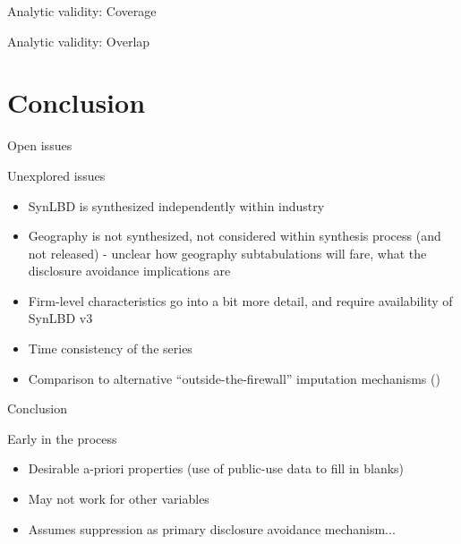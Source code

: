 \begin{frame}[fragile]{Analytic validity: Coverage}
	\begin{center}
		\footnotesize
		
		
		
	\end{center}
\end{frame}

\begin{frame}[fragile]{Analytic validity: Overlap}
	\begin{center}
		\footnotesize
		
		
		
	\end{center}
\end{frame}









\section{Conclusion}

\begin{frame}{Open issues}
\begin{block}{Unexplored issues}
\begin{itemize}[<+->]
\item SynLBD is synthesized independently within industry
\item Geography is not synthesized, not considered within synthesis process (and not released) 
- unclear how geography subtabulations will fare, what the disclosure avoidance implications are
\item Firm-level characteristics go into a bit more detail, and require availability of SynLBD v3
\item Time consistency of the series
\item Comparison to alternative ``outside-the-firewall'' imputation mechanisms 
(\cite{HolanEtAl2010,BradleyEtAl2014})
\end{itemize}
\end{block}
\end{frame}


\begin{frame}{Conclusion}
\begin{block}{Early in the process}
\begin{itemize}
\item Desirable a-priori properties (use of public-use data to fill in blanks)
\item May not work for other variables
\item Assumes suppression as primary disclosure avoidance mechanism...
\end{itemize}\end{block}
\end{frame}

